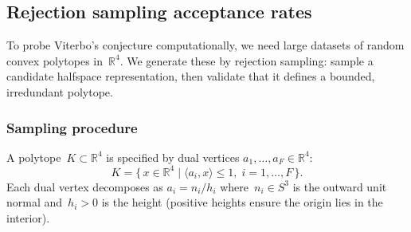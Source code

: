 %
%
%

\subsection{Rejection sampling acceptance rates}
\label{sec:rejection-calibration}

To probe Viterbo's conjecture computationally, we need large datasets of
random convex polytopes in~$\mathbb{R}^4$. We generate these by rejection
sampling: sample a candidate halfspace representation, then validate that it
defines a bounded, irredundant polytope.

\subsubsection*{Sampling procedure}

A polytope~$K \subset \mathbb{R}^4$ is specified by dual vertices
$a_1, \ldots, a_F \in \mathbb{R}^4$:
\[
  K = \bigl\{\, x \in \mathbb{R}^4 \;\big|\; \langle a_i, x \rangle \le 1,\;
  i = 1, \ldots, F \,\bigr\}.
\]
Each dual vertex decomposes as $a_i = n_i / h_i$ where~$n_i \in S^3$ is the
outward unit normal and~$h_i > 0$ is the height
(positive heights ensure the origin lies in the interior).

